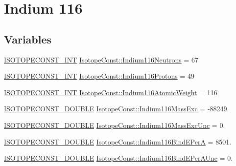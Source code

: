 \hypertarget{group___isotope_const-_indium-_in116}{}\section{Indium 116}
\label{group___isotope_const-_indium-_in116}
\subsection*{Variables}
\begin{DoxyCompactItemize}
\item 
\mbox{\hyperlink{group___isotope_const-_macros_ga5f18360b3e99483a35c32d789e62621c}{I\+S\+O\+T\+O\+P\+E\+C\+O\+N\+S\+T\+\_\+\+I\+NT}} \mbox{\hyperlink{group___isotope_const-_indium-_in116_ga320218f6acb0c2052ff45f9ee69c9cc3}{Isotope\+Const\+::\+Indium116\+Neutrons}} = 67
\item 
\mbox{\hyperlink{group___isotope_const-_macros_ga5f18360b3e99483a35c32d789e62621c}{I\+S\+O\+T\+O\+P\+E\+C\+O\+N\+S\+T\+\_\+\+I\+NT}} \mbox{\hyperlink{group___isotope_const-_indium-_in116_gac44f2ba45c6d240e649d3f55d5697d7a}{Isotope\+Const\+::\+Indium116\+Protons}} = 49
\item 
\mbox{\hyperlink{group___isotope_const-_macros_ga5f18360b3e99483a35c32d789e62621c}{I\+S\+O\+T\+O\+P\+E\+C\+O\+N\+S\+T\+\_\+\+I\+NT}} \mbox{\hyperlink{group___isotope_const-_indium-_in116_gad06433f9ceda1755fe4eeb03e0c87eab}{Isotope\+Const\+::\+Indium116\+Atomic\+Weight}} = 116
\item 
\mbox{\hyperlink{group___isotope_const-_macros_ga8f45a7272ce02c0b4c65c44636ed719a}{I\+S\+O\+T\+O\+P\+E\+C\+O\+N\+S\+T\+\_\+\+D\+O\+U\+B\+LE}} \mbox{\hyperlink{group___isotope_const-_indium-_in116_gaab6194b337bff23feae52a0cd75e159a}{Isotope\+Const\+::\+Indium116\+Mass\+Exc}} = -\/88249.
\item 
\mbox{\hyperlink{group___isotope_const-_macros_ga8f45a7272ce02c0b4c65c44636ed719a}{I\+S\+O\+T\+O\+P\+E\+C\+O\+N\+S\+T\+\_\+\+D\+O\+U\+B\+LE}} \mbox{\hyperlink{group___isotope_const-_indium-_in116_ga3cfe8d49e6b2797c08f126c68b3b6a58}{Isotope\+Const\+::\+Indium116\+Mass\+Exc\+Unc}} = 0.
\item 
\mbox{\hyperlink{group___isotope_const-_macros_ga8f45a7272ce02c0b4c65c44636ed719a}{I\+S\+O\+T\+O\+P\+E\+C\+O\+N\+S\+T\+\_\+\+D\+O\+U\+B\+LE}} \mbox{\hyperlink{group___isotope_const-_indium-_in116_gaaaf3907fc7a8dc9a2ba60c8a15e2ee02}{Isotope\+Const\+::\+Indium116\+Bind\+E\+PerA}} = 8501.
\item 
\mbox{\hyperlink{group___isotope_const-_macros_ga8f45a7272ce02c0b4c65c44636ed719a}{I\+S\+O\+T\+O\+P\+E\+C\+O\+N\+S\+T\+\_\+\+D\+O\+U\+B\+LE}} \mbox{\hyperlink{group___isotope_const-_indium-_in116_ga10c9a82eefdbe67ab5516f9c651a1ab2}{Isotope\+Const\+::\+Indium116\+Bind\+E\+Per\+A\+Unc}} = 0.

\end{DoxyCompactItemize}
